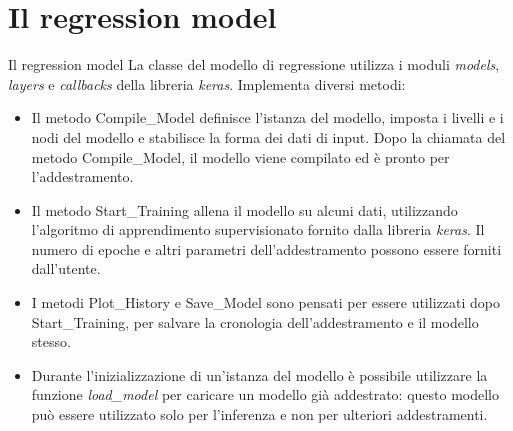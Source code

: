 \documentclass{beamer}
\begin{document}

\section{Il regression model}
\begin{frame}{Il regression model}
La classe del modello di regressione utilizza i moduli \emph{models}, \emph{layers} e \emph{callbacks} della libreria \emph{keras}.
Implementa diversi metodi:
\pause
\begin{itemize}
\item Il metodo Compile\_Model definisce l'istanza del modello, imposta i livelli e i nodi del modello e stabilisce la forma dei dati di input. Dopo la chiamata del metodo Compile\_Model, il modello viene compilato ed è pronto per l'addestramento.
\pause
\item Il metodo Start\_Training allena il modello su alcuni dati, utilizzando l'algoritmo di apprendimento supervisionato fornito dalla libreria \emph{keras}. Il numero di epoche e altri parametri dell'addestramento possono essere forniti dall'utente.
\pause
\item I metodi Plot\_History e Save\_Model sono pensati per essere utilizzati dopo Start\_Training, per salvare la cronologia dell'addestramento e il modello stesso.
\pause
\item Durante l'inizializzazione di un'istanza del modello è possibile utilizzare la funzione \emph{load\_model} per caricare un modello già addestrato: questo modello può essere utilizzato solo per l'inferenza e non per ulteriori addestramenti.
\end{itemize}

\end{frame}

\end{document}
